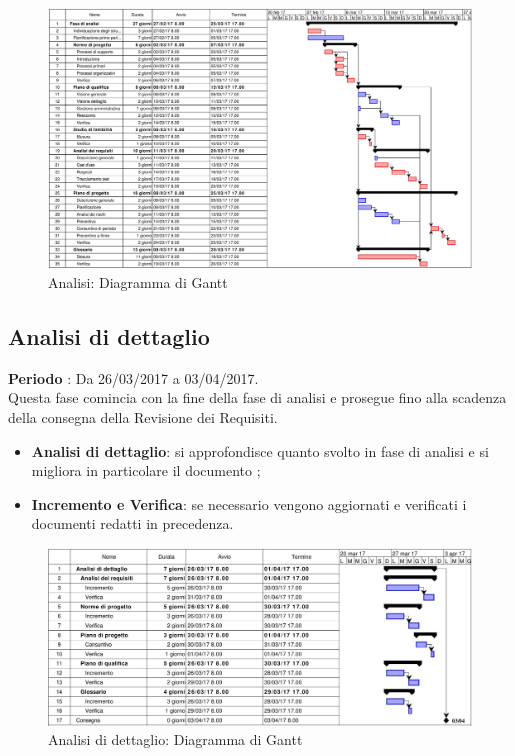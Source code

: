 \documentclass[../PianoDiProgetto.tex]{subfiles}
\begin{document}
		\begin{figure}[H]
			\centering
			\includegraphics[scale=0.55]{Figures/Gantt_Analisi.jpg}
			\caption{Analisi: Diagramma di Gantt}
		\end{figure}
			
			
			
		\subsection{Analisi di dettaglio}
		\textbf{Periodo} : Da 26/03/2017 a 03/04/2017. \\
		Questa fase comincia con la fine della fase di analisi e prosegue fino alla scadenza della consegna della Revisione dei Requisiti.
		\begin{itemize}
			\item \textbf{Analisi di dettaglio}: si approfondisce quanto svolto in fase di analisi e si migliora in particolare il documento \analisideirequisiti ;
			\item \textbf{Incremento e Verifica}: se necessario vengono aggiornati e verificati i documenti redatti in precedenza.
		\end{itemize}
		\begin{figure}[H]
			\centering
			\includegraphics[scale=0.55]{Figures/Gantt_AnalisiDettaglio.jpg}
			\caption{Analisi di dettaglio: Diagramma di Gantt}
		\end{figure}
	
\end{document}
